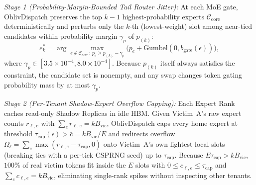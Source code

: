 \documentclass[final,5p,times,twocolumn]{elsarticle}
\def\OD{OblivDispatch}%
\theoremstyle{definition}
\theoremstyle{remark}
\newcommand{\OD}{\textsc{OblivDispatch}}
\begin{document}
\emph{Stage 1 (Probability-Margin-Bounded Tail Router Jitter):} At each MoE gate, \OD{} preserves the top $k-1$ highest-probability experts $\mathcal{C}_{\mathrm{core}}$ deterministically and perturbs only the $k$-th (lowest-weight) slot among near-tied candidates within probability margin $\gamma_p$ of $p_{(k)}$:
\begin{equation}\label{eq:margin_gumbel}
  e_k^* = \arg\max_{e \notin \mathcal{C}_{\mathrm{core}} \,:\, p_e \ge p_{(k)} - \gamma_p} \big( p_e + \mathrm{Gumbel}(0, b_{\mathrm{gate}}(\epsilon)) \big),
\end{equation}
where $\gamma_p \in [3.5 \times 10^{-4}, 8.0 \times 10^{-4}]$. Because $p_{(k)}$ itself always satisfies the constraint, the candidate set is nonempty, and any swap changes token gating probability mass by at most $\gamma_p$.

\emph{Stage 2 (Per-Tenant Shadow-Expert Overflow Capping):} Each Expert Rank caches read-only Shadow Replicas in idle HBM. Given Victim~A's raw expert counts $r_{\ell, e}$ with $\sum_e r_{\ell, e} = k B_{\mathrm{vic}}$, \OD{} caps every home expert at threshold $\tau_{\mathrm{cap}}(\epsilon) > \bar{c} = k B_{\mathrm{vic}}/E$ and redirects overflow $\Omega_\ell = \sum_e \max(r_{\ell, e} - \tau_{\mathrm{cap}}, 0)$ onto Victim~A's own lightest local slots (breaking ties with a per-tick CSPRNG seed) up to $\tau_{\mathrm{cap}}$. Because $E \tau_{\mathrm{cap}} > k B_{\mathrm{vic}}$, $100\%$ of real victim tokens fit inside the $E$ slots with $0 \le c_{\ell, e} \le \tau_{\mathrm{cap}}$ and $\sum_e c_{\ell, e} = k B_{\mathrm{vic}}$, eliminating single-rank spikes without inspecting other tenants.
\end{document}

